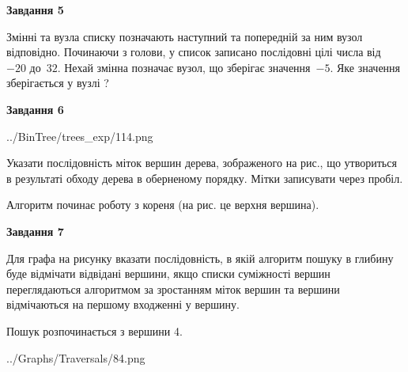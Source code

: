 \documentclass[12pt, ukrainian]{article}
\begin{document}
{\begin {large}
{\begin {center}\textbf{Завдання 5}\end {center}}\par
Змінні  та  вузла списку позначають наступний та попередній за ним вузол відповідно. Починаючи з голови, у список записано послідовні цілі числа від~$-20$ до~$32$. Нехай змінна  позначає вузол, що зберігає значення~$-5$.
Яке значення зберігається у вузлі  ?\par
\newpage

{\begin {center}\textbf{Завдання 6}\end {center}}\par

\begin{center}
	{../BinTree/trees_exp/114.png}
\end{center}
Указати послідовність міток вершин дерева, зображеного на рис., що утвориться в результаті обходу дерева в оберненому порядку. Мітки записувати через пробіл.\par Алгоритм починає роботу з кореня (на рис. це верхня вершина).\par
\newpage

{\begin {center}\textbf{Завдання 7}\end {center}}\par
Для графа на рисунку вказати послідовність, в якій алгоритм пошуку в глибину буде відмічати відвідані вершини, якщо списки суміжності вершин переглядаються алгоритмом за зростанням міток вершин та вершини відмічаються на першому вход\-женні у вершину.\par
Пошук розпочинається з вершини 4.\par

\begin{center}
	{../Graphs/Traversals/84.png}
\end{center}\par
\newpage


\end{large}}
\end{document}
